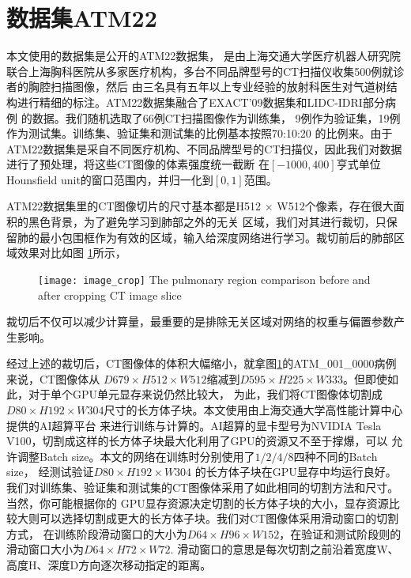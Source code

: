 \section{数据集ATM22}\label{sec:ATM22dataset}\label{sec:ATM22}
本文使用的数据集是公开的ATM22数据集\cite{Zhang2022CFDA, Zhang2021Airway, Yu2022Bronchi, Qin2019AirwayNet}，
是由上海交通大学医疗机器人研究院联合上海胸科医院从多家医疗机构，多台不同品牌型号的CT扫描仪收集500例就诊者的胸腔扫描图像，然后
由三名具有五年以上专业经验的放射科医生对气道树结构进行精细的标注。ATM22数据集融合了EXACT'09数据集和LIDC-IDRI部分病例
的数据。我们随机选取了66例CT扫描图像作为训练集， 9例作为验证集，19例作为测试集。训练集、验证集和测试集的比例基本按照70:10:20
的比例来。由于ATM22数据集是采自不同医疗机构、不同品牌型号的CT扫描仪，因此我们对数据进行了预处理，将这些CT图像的体素强度统一截断
在$[-1000, 400]$亨式单位Hounsfield unit的窗口范围内，并归一化到$[0, 1]$范围。

ATM22数据集里的CT图像切片的尺寸基本都是H512 $\times$ W512个像素，存在很大面积的黑色背景，为了避免学习到肺部之外的无关
区域，我们对其进行裁切，只保留肺的最小包围框作为有效的区域，输入给深度网络进行学习。裁切前后的肺部区域效果对比如图
\ref{fig:cropimage}所示，
\begin{figure}[htbp]
    \centering
    \texttt{[image: image\_crop]}
    	{The pulmonary region comparison before and after cropping CT image slice}
    \label{fig:cropimage}
\end{figure}
裁切后不仅可以减少计算量，最重要的是排除无关区域对网络的权重与偏置参数产生影响。

经过上述的裁切后，CT图像体的体积大幅缩小，就拿图\ref{fig:cropimage}的ATM\_001\_0000病例来说，CT图像体从
$D679 \times H512 \times W512$缩减到$D595 \times H225 \times W333$。但即使如此，对于单个GPU单元显存来说仍然比较大，
为此，我们将CT图像体切割成$D80 \times H192 \times W304$尺寸的长方体子块。本文使用由上海交通大学高性能计算中心提供的AI超算平台
来进行训练与计算的。AI超算的显卡型号为NVIDIA Tesla V100，切割成这样的长方体子块最大化利用了GPU的资源又不至于撑爆，可以
允许调整Batch size。本文的网络在训练时分别使用了$1 / 2 / 4 / 8$四种不同的Batch size， 经测试验证$D80 \times H192 \times W304$
的长方体子块在GPU显存中均运行良好。我们对训练集、验证集和测试集的CT图像体采用了如此相同的切割方法和尺寸。当然，你可能根据你的
GPU显存资源决定切割的长方体子块的大小，显存资源比较大则可以选择切割成更大的长方体子块。我们对CT图像体采用滑动窗口的切割方式，
在训练阶段滑动窗口的大小为$D64 \times H96 \times W152$，在验证和测试阶段则的滑动窗口大小为$D64 \times H72 \times W72$.
滑动窗口的意思是每次切割之前沿着宽度W、高度H、深度D方向逐次移动指定的距离。

